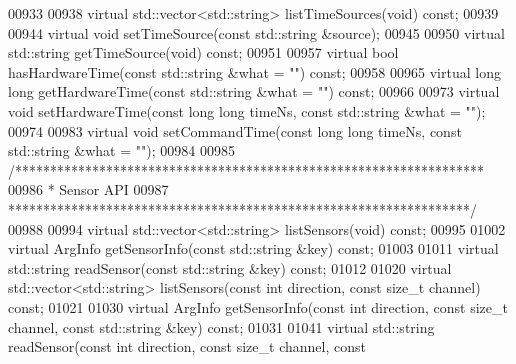 \begin{DoxyCode}
00933 
00938     \textcolor{keyword}{virtual} std::vector<std::string> listTimeSources(\textcolor{keywordtype}{void}) \textcolor{keyword}{const};
00939 
00944     \textcolor{keyword}{virtual} \textcolor{keywordtype}{void} setTimeSource(\textcolor{keyword}{const} std::string &source);
00945 
00950     \textcolor{keyword}{virtual} std::string getTimeSource(\textcolor{keywordtype}{void}) \textcolor{keyword}{const};
00951 
00957     \textcolor{keyword}{virtual} \textcolor{keywordtype}{bool} hasHardwareTime(\textcolor{keyword}{const} std::string &what = \textcolor{stringliteral}{""}) \textcolor{keyword}{const};
00958 
00965     \textcolor{keyword}{virtual} \textcolor{keywordtype}{long} \textcolor{keywordtype}{long} getHardwareTime(\textcolor{keyword}{const} std::string &what = \textcolor{stringliteral}{""}) \textcolor{keyword}{const};
00966 
00973     \textcolor{keyword}{virtual} \textcolor{keywordtype}{void} setHardwareTime(\textcolor{keyword}{const} \textcolor{keywordtype}{long} \textcolor{keywordtype}{long} timeNs, \textcolor{keyword}{const} std::string &what = \textcolor{stringliteral}{""});
00974 
00983     \textcolor{keyword}{virtual} \textcolor{keywordtype}{void} setCommandTime(\textcolor{keyword}{const} \textcolor{keywordtype}{long} \textcolor{keywordtype}{long} timeNs, \textcolor{keyword}{const} std::string &what = \textcolor{stringliteral}{""});
00984 
00985     \textcolor{comment}{/*******************************************************************}
00986 \textcolor{comment}{     * Sensor API}
00987 \textcolor{comment}{     ******************************************************************/}
00988 
00994     \textcolor{keyword}{virtual} std::vector<std::string> listSensors(\textcolor{keywordtype}{void}) \textcolor{keyword}{const};
00995 
01002     \textcolor{keyword}{virtual} ArgInfo getSensorInfo(\textcolor{keyword}{const} std::string &key) \textcolor{keyword}{const};
01003 
01011     \textcolor{keyword}{virtual} std::string readSensor(\textcolor{keyword}{const} std::string &key) \textcolor{keyword}{const};
01012 
01020     \textcolor{keyword}{virtual} std::vector<std::string> listSensors(\textcolor{keyword}{const} \textcolor{keywordtype}{int} direction, \textcolor{keyword}{const} \textcolor{keywordtype}{size\_t} channel) \textcolor{keyword}{const};
01021 
01030     \textcolor{keyword}{virtual} ArgInfo getSensorInfo(\textcolor{keyword}{const} \textcolor{keywordtype}{int} direction, \textcolor{keyword}{const} \textcolor{keywordtype}{size\_t} channel, \textcolor{keyword}{const} 
      std::string &key) \textcolor{keyword}{const};
01031 
01041     \textcolor{keyword}{virtual} std::string readSensor(\textcolor{keyword}{const} \textcolor{keywordtype}{int} direction, \textcolor{keyword}{const} \textcolor{keywordtype}{size\_t} channel, \textcolor{keyword}{const} 

\end{DoxyCode}
